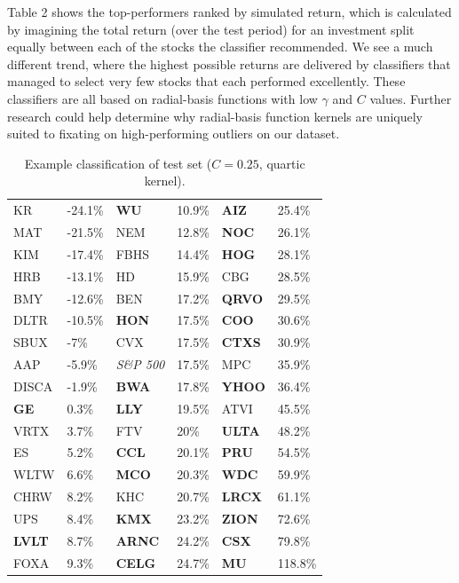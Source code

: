 \documentclass[format=acmlarge]{acmart}
\begin{document}
Table 2 shows the top-performers ranked by simulated return, which is calculated by imagining the total return (over the test period) for an investment split equally between each of the stocks the classifier recommended.  We see a much different trend, where the highest possible returns are delivered by classifiers that managed to select very few stocks that each performed excellently.  These classifiers are all based on radial-basis functions with low $\gamma$ and $C$ values.  Further research could help determine why radial-basis function kernels are uniquely suited to fixating on high-performing outliers on our dataset.

\begin{table}
  \caption{Example classification of test set ($C = 0.25$, quartic kernel).}
  \label{tab:three}
  \begin{tabular}{ll|ll|ll}
KR & -24.1\%   & \textbf{WU} & 10.9\%    & \textbf{AIZ} & 25.4\%\\
MAT & -21.5\%  & NEM & 12.8\%   & \textbf{NOC} & 26.1\%\\
KIM & -17.4\%  & FBHS & 14.4\%  & \textbf{HOG} & 28.1\%\\
HRB & -13.1\%  & HD & 15.9\%    & CBG & 28.5\%\\
BMY & -12.6\%  & BEN & 17.2\%   & \textbf{QRVO} & 29.5\%\\
DLTR & -10.5\% & \textbf{HON} & 17.5\%   & \textbf{COO} & 30.6\%\\
SBUX & -7\%    & CVX & 17.5\%   & \textbf{CTXS} & 30.9\%\\
AAP & -5.9\%   & \textit{S\&P 500} & 17.5\% & MPC & 35.9\%\\
DISCA & -1.9\% & \textbf{BWA} & 17.8\%   & \textbf{YHOO} & 36.4\%\\
\textbf{GE} & 0.3\%     & \textbf{LLY} & 19.5\%   & ATVI & 45.5\%\\
VRTX & 3.7\%   & FTV & 20\%     & \textbf{ULTA} & 48.2\%\\
ES & 5.2\%     & \textbf{CCL} & 20.1\%   & \textbf{PRU} & 54.5\%\\
WLTW & 6.6\%   & \textbf{MCO} & 20.3\%   & \textbf{WDC} & 59.9\%\\
CHRW & 8.2\%   & KHC & 20.7\%   & \textbf{LRCX} & 61.1\%\\
UPS & 8.4\%    & \textbf{KMX} & 23.2\%   & \textbf{ZION} & 72.6\%\\
\textbf{LVLT} & 8.7\%   & \textbf{ARNC} & 24.2\%  & \textbf{CSX} & 79.8\%\\
FOXA & 9.3\%   & \textbf{CELG} & 24.7\%  & \textbf{MU} & 118.8\%\\
  \end{tabular}
\end{table}
\end{document}

